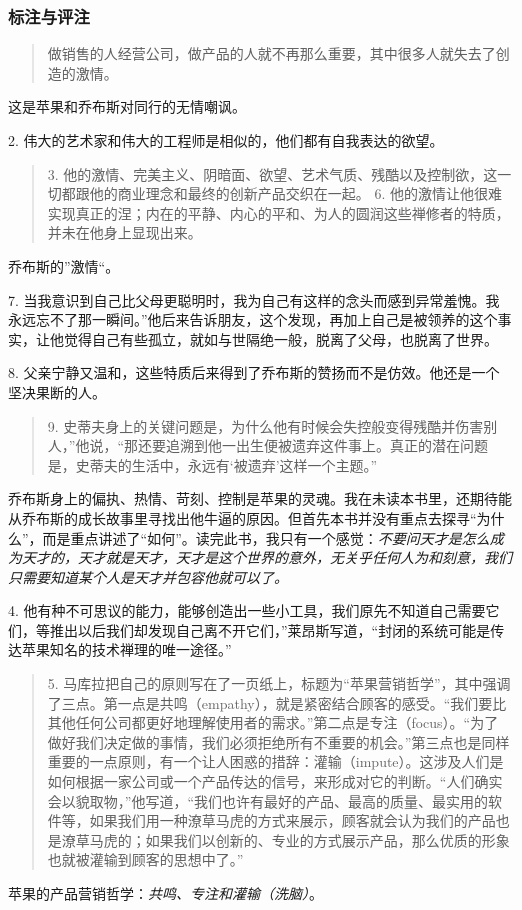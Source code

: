\subsubsection{标注与评注}
\begin{quotation}
做销售的人经营公司，做产品的人就不再那么重要，其中很多人就失去了创造的激情。
\end{quotation}
这是苹果和乔布斯对同行的无情嘲讽。

2. 伟大的艺术家和伟大的工程师是相似的，他们都有自我表达的欲望。

\begin{quotation}
3. 他的激情、完美主义、阴暗面、欲望、艺术气质、残酷以及控制欲，这一切都跟他的商业理念和最终的创新产品交织在一起。
6. 他的激情让他很难实现真正的涅；内在的平静、内心的平和、为人的圆润这些禅修者的特质，并未在他身上显现出来。
\end{quotation}
乔布斯的”激情“。

7. 当我意识到自己比父母更聪明时，我为自己有这样的念头而感到异常羞愧。我永远忘不了那一瞬间。”他后来告诉朋友，这个发现，再加上自己是被领养的这个事实，让他觉得自己有些孤立，就如与世隔绝一般，脱离了父母，也脱离了世界。

8. 父亲宁静又温和，这些特质后来得到了乔布斯的赞扬而不是仿效。他还是一个坚决果断的人。

\begin{quotation}
9. 史蒂夫身上的关键问题是，为什么他有时候会失控般变得残酷并伤害别人，”他说，“那还要追溯到他一出生便被遗弃这件事上。真正的潜在问题是，史蒂夫的生活中，永远有‘被遗弃’这样一个主题。”
\end{quotation}

乔布斯身上的偏执、热情、苛刻、控制是苹果的灵魂。我在未读本书里，还期待能从乔布斯的成长故事里寻找出他牛逼的原因。但首先本书并没有重点去探寻“为什么”，而是重点讲述了“如何”。读完此书，我只有一个感觉：\emph{不要问天才是怎么成为天才的，天才就是天才，天才是这个世界的意外，无关乎任何人为和刻意，我们只需要知道某个人是天才并包容他就可以了。}

4. 他有种不可思议的能力，能够创造出一些小工具，我们原先不知道自己需要它们，等推出以后我们却发现自己离不开它们，”莱昂斯写道，“封闭的系统可能是传达苹果知名的技术禅理的唯一途径。”

\begin{quotation}
5. 马库拉把自己的原则写在了一页纸上，标题为“苹果营销哲学”，其中强调了三点。第一点是共鸣（empathy），就是紧密结合顾客的感受。“我们要比其他任何公司都更好地理解使用者的需求。”第二点是专注（focus）。“为了做好我们决定做的事情，我们必须拒绝所有不重要的机会。”第三点也是同样重要的一点原则，有一个让人困惑的措辞：灌输（impute）。这涉及人们是如何根据一家公司或一个产品传达的信号，来形成对它的判断。“人们确实会以貌取物，”他写道，“我们也许有最好的产品、最高的质量、最实用的软件等，如果我们用一种潦草马虎的方式来展示，顾客就会认为我们的产品也是潦草马虎的；如果我们以创新的、专业的方式展示产品，那么优质的形象也就被灌输到顾客的思想中了。”
\end{quotation}
苹果的产品营销哲学：\emph{共鸣、专注和灌输（洗脑）}。
